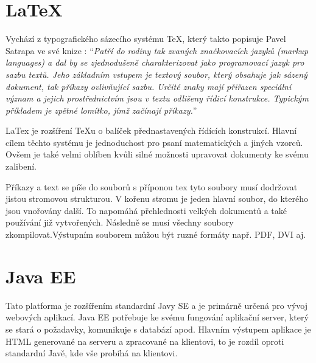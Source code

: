   
 \section{LaTeX}
	Vychází z typografického sázecího systému TeX, který takto popisuje Pavel Satrapa ve své knize \cite{latex}: \enquote{\textit{Patří do rodiny tak zvaných značkovacích jazyků (markup languages) a dal by se zjednodušeně charakterizovat jako programovací jazyk pro sazbu textů. Jeho základním vstupem je textový soubor, který obsahuje jak sázený dokument, tak příkazy ovlivňující sazbu. Určité znaky mají přiřazen speciální význam a jejich prostřednictvím jsou v textu odlišeny řídicí konstrukce. Typickým příkladem je zpětné lomítko, jímž začínají příkazy.}}
	 
	LaTex je rozšíření TeXu o balíček přednastavených řídících konstrukcí. Hlavní cílem těchto systému je jednoduchost pro psaní matematických a jiných vzorců. Ovšem je také velmi oblíben kvůli silné možnosti upravovat dokumenty ke svému zalibení.
	
	Příkazy a text se píše do souborů s příponou tex tyto soubory musí dodržovat jistou stromovou strukturou. V kořenu stromu je jeden hlavní soubor, do kterého jsou vnořovány další. To napomáhá přehlednosti velkých dokumentů a také používání již vytvořených. Následně se musí všechny soubory zkompilovat.Výstupním souborem můžou být ruzné formáty např. PDF, DVI aj. 

\section{Java EE}
	Tato platforma je rozšířením standardní Javy SE a je primárně určená pro vývoj webových aplikací. Java EE potřebuje ke svému fungování aplikační server, který se stará o požadavky, komunikuje s databází apod. Hlavním výstupem aplikace je HTML generované na serveru a zpracované na klientovi, to je rozdíl oproti standardní Javě, kde vše probíhá na klientovi. 

